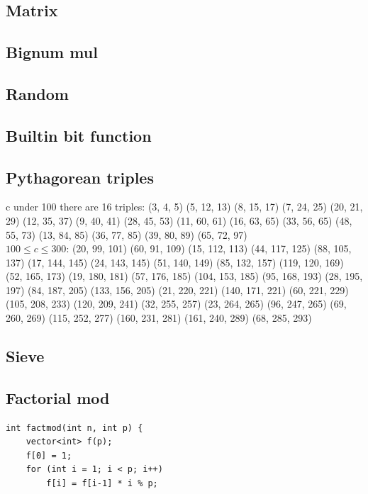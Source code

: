 \documentclass[A4 paper, 12pt, oneside, landscape]{article}
\begin{document}
\begin{multicols}{2}
    \subsection{Matrix}
    

	\subsection{Bignum mul}
	
	
	\subsection{Random}
	
	
	\subsection{Builtin bit function}
	
	
	\subsection{Pythagorean triples}
	c under 100 there are 16 triples:
	(3, 4, 5)	(5, 12, 13)	(8, 15, 17)	(7, 24, 25)
(20, 21, 29)	(12, 35, 37)	(9, 40, 41)	(28, 45, 53)
(11, 60, 61)	(16, 63, 65)	(33, 56, 65)	(48, 55, 73)
(13, 84, 85)	(36, 77, 85)	(39, 80, 89)	(65, 72, 97) \\

	$100 \leq c \leq 300$:
	(20, 99, 101)	(60, 91, 109)	(15, 112, 113)	(44, 117, 125)
(88, 105, 137)	(17, 144, 145)	(24, 143, 145)	(51, 140, 149)
(85, 132, 157)	(119, 120, 169)	(52, 165, 173)	(19, 180, 181)
(57, 176, 185)	(104, 153, 185)	(95, 168, 193)	(28, 195, 197)
(84, 187, 205)	(133, 156, 205)	(21, 220, 221)	(140, 171, 221)
(60, 221, 229)	(105, 208, 233)	(120, 209, 241)	(32, 255, 257)
(23, 264, 265)	(96, 247, 265)	(69, 260, 269)	(115, 252, 277)
(160, 231, 281)	(161, 240, 289)	(68, 285, 293)

	\subsection{Sieve}
	

    \subsection{Factorial mod}
    \begin{lstlisting}
int factmod(int n, int p) {
    vector<int> f(p);
    f[0] = 1;
    for (int i = 1; i < p; i++)
        f[i] = f[i-1] * i % p;


\end{lstlisting}
\end{multicols}
\end{document}
